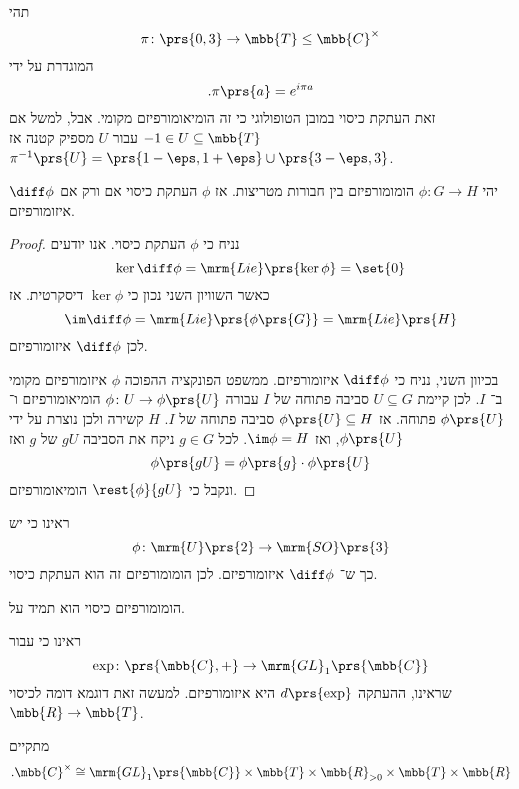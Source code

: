 \documentclass[10pt, twoside]{book}
\newcommand{\Lie}{\mrm{Lie}}
\begin{document}
\begin{example}
תהי
\[\pi \colon \prs{0,3} \to \mbb{T} \leq \mbb{C}^\times\]
המוגדרת על ידי
\[\text{.}\pi\prs{a} = e^{i \pi a}\]
זאת העתקת כיסוי במובן הטופולוגי כי זה הומיאומורפיזם מקומי.
אבל, למשל אם
$-1 \in U \subseteq \mbb{T}$
עבור
$U$
מספיק קטנה אז
$\pi^{-1}\prs{U} = \prs{1-\eps, 1 + \eps} \cup \prs{3-\eps, 3}$.
\end{example}

\begin{lemma}
יהי
$\phi \colon G \to H$
הומומורפיזם בין חבורות מטריצות.
אז
$\phi$
העתקת כיסוי אם ורק אם
$\diff \phi$
איזומורפיזם.
\end{lemma}

\begin{proof}
נניח כי
$\phi$
העתקת כיסוי.
אנו יודעים
\[\ker \diff \phi = \Lie\prs{\ker \phi} = \set{0}\]
כאשר השוויון השני נכון כי
$\ker \phi$
דיסקרטית.
אז
\[\im \diff \phi = \Lie\prs{\phi\prs{G}} = \Lie\prs{H}\]
לכן
$\diff \phi$
איזומורפיזם.

בכיוון השני, נניח כי
$\diff \phi$
איזומורפיזם.
ממשפט הפונקציה ההפוכה
$\phi$
איזומורפיזם מקומי ב־%
$I$.
לכן קיימת
$U \subseteq G$
סביבה פתוחה של
$I$
עבורה
$\phi \colon U \to \phi\prs{U}$
הומיאומורפיזם ו־%
$\phi\prs{U}$
פתוחה.
אז
$\phi\prs{U} \subseteq H$
סביבה פתוחה של
$I$.
$H$
קשירה ולכן נוצרת על ידי
$\phi\prs{U}$,
ואז
$\im \phi = H$.
לכל
$g \in G$
ניקח את הסביבה
$gU$
של
$g$
ואז
\[\phi\prs{gU} = \phi\prs{g} \cdot \phi\prs{U}\]
ונקבל כי
$\rest{\phi}{gU}$
הומיאומורפיזם.
\end{proof}

\begin{example}
ראינו כי יש
\[\phi \colon \mrm{U}\prs{2} \to \mrm{SO}\prs{3}\]
כך ש־%
$\diff \phi$
איזומורפיזם. לכן הומומורפיזם זה הוא העתקת כיסוי.
\end{example}

\begin{exercise}
הומומורפיזם כיסוי הוא תמיד על.
\end{exercise}

\begin{example}
ראינו כי עבור
\[\exp \colon \prs{\mbb{C}, +} \to \mrm{GL}_1\prs{\mbb{C}}\]
שראינו, ההעתקה
$d\prs{\exp}$
היא איזומורפיזם.
למעשה זאת דוגמא דומה לכיסוי
$\mbb{R} \to \mbb{T}$.

מתקיים
\[\text{.} \mbb{C}^\times \cong \mrm{GL}_1\prs{\mbb{C}} \times \mbb{T} \times \mbb{R}_{>0} \times \mbb{T} \times \mbb{R}\]
\end{example}

\end{document}
